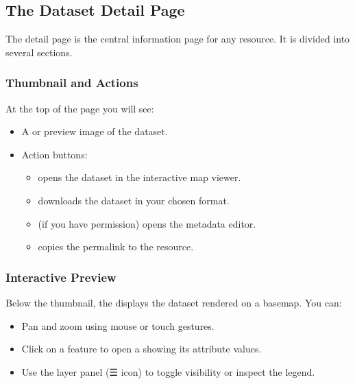 \documentclass[letterpaper,10pt,english]{sphinxmanual}
\begin{document}
\subsection{The Dataset Detail Page}
\label{\detokenize{en/02_find_and_visualize:the-dataset-detail-page}}
\sphinxAtStartPar
The detail page is the central information page for any resource. It is divided into
several sections.


\subsubsection{Thumbnail and Actions}
\label{\detokenize{en/02_find_and_visualize:thumbnail-and-actions}}
\sphinxAtStartPar
At the top of the page you will see:
\begin{itemize}
\item {} 
\sphinxAtStartPar
A  or preview image of the dataset.

\item {} 
\sphinxAtStartPar
Action buttons:
\begin{itemize}
\item {} 
\sphinxAtStartPar
{} \textendash{} opens the dataset in the interactive map viewer.

\item {} 
\sphinxAtStartPar
{} \textendash{} downloads the dataset in your chosen format.

\item {} 
\sphinxAtStartPar
{} (if you have permission) \textendash{} opens the metadata editor.

\item {} 
\sphinxAtStartPar
{} \textendash{} copies the permalink to the resource.

\end{itemize}

\end{itemize}


\subsubsection{Interactive Preview}
\label{\detokenize{en/02_find_and_visualize:interactive-preview}}
\sphinxAtStartPar
Below the thumbnail, the  displays the dataset rendered on a
basemap. You can:
\begin{itemize}
\item {} 
\sphinxAtStartPar
Pan and zoom using mouse or touch gestures.

\item {} 
\sphinxAtStartPar
Click on a feature to open a  showing its attribute values.

\item {} 
\sphinxAtStartPar
Use the layer panel (☰ icon) to toggle visibility or inspect the legend.

\end{itemize}
\end{document}
